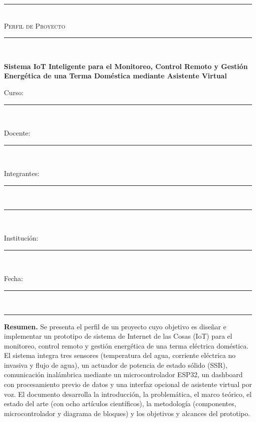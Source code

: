 \documentclass[11pt,a4paper]{article}
\begin{document}
\begin{titlepage}
\centering
\vspace*{1.2cm}
{\color{softline}\rule{\textwidth}{0.8pt}}\\[0.5cm]
{\large\scshape Perfil de Proyecto}\\[0.35cm]
{\color{accent}\rule{0.28\textwidth}{2.2pt}}\\[1.0cm]

{\Huge\bfseries\color{primary} Sistema IoT Inteligente para el Monitoreo, Control Remoto y Gestión Energética de una Terma Doméstica mediante Asistente Virtual\par}

\vspace{1.2cm}
{\large Curso: \rule{6cm}{0.4pt}}\\[0.45cm]
{\large Docente: \rule{6cm}{0.4pt}}\\[0.45cm]
{\large Integrantes: \rule{6cm}{0.4pt}}\\[0.25cm]
{\large \phantom{Integrantes:} \rule{6cm}{0.4pt}}\\[0.45cm]
{\large Institución: \rule{6cm}{0.4pt}}\\[0.45cm]
{\large Fecha: \rule{6cm}{0.4pt}}\\[1.4cm]

{\color{softline}\rule{\textwidth}{0.8pt}}

\vfill
\begin{minipage}{0.86\textwidth}
\small
\textbf{\color{primary}Resumen.} Se presenta el perfil de un proyecto cuyo objetivo es diseñar e implementar un prototipo de sistema de Internet de las Cosas (IoT) para el monitoreo, control remoto y gestión energética de una terma eléctrica doméstica. El sistema integra tres sensores (temperatura del agua, corriente eléctrica no invasiva y flujo de agua), un actuador de potencia de estado sólido (SSR), comunicación inalámbrica mediante un microcontrolador ESP32, un dashboard con procesamiento previo de datos y una interfaz opcional de asistente virtual por voz. El documento desarrolla la introducción, la problemática, el marco teórico, el estado del arte (con ocho artículos científicos), la metodología (componentes, microcontrolador y diagrama de bloques) y los objetivos y alcances del prototipo.
\end{minipage}
\end{titlepage}

\tableofcontents
\clearpage
{}
\end{document}
